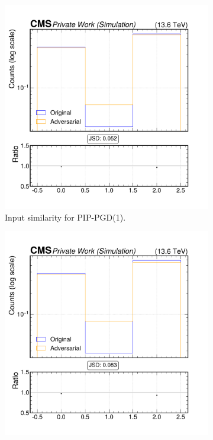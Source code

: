\begin{figure}[h]
  \centering
  \begin{subfigure}[t]{0.32\textwidth}
    \includegraphics[width=\linewidth]{media/output/features/compare/combined_it_1/cmp_global_features_TagVarCSV_vertexCategory.pdf}
    \caption*{Input similarity for PIP-PGD(1).}
  \end{subfigure}\hfill
  \begin{subfigure}[t]{0.32\textwidth}
    \includegraphics[width=\linewidth]{media/output/features/compare/combined_it_2/cmp_global_features_TagVarCSV_vertexCategory.pdf}

\end{subfigure}
\end{figure}
